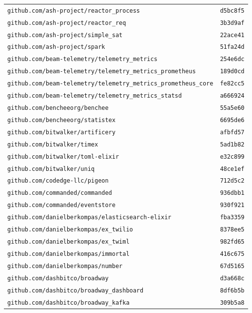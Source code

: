\begin{longtable}{@{}p{} l@{}}
\texttt{github.com/ash-project/reactor\_process} & \texttt{d5bc8f5} \\
\texttt{github.com/ash-project/reactor\_req} & \texttt{3b3d9af} \\
\texttt{github.com/ash-project/simple\_sat} & \texttt{22ace41} \\
\texttt{github.com/ash-project/spark} & \texttt{51fa24d} \\
\texttt{github.com/beam-telemetry/telemetry\_metrics} & \texttt{254e6dc} \\
\texttt{github.com/beam-telemetry/telemetry\_metrics\_prometheus} & \texttt{189d0cd} \\
\texttt{github.com/beam-telemetry/telemetry\_metrics\_prometheus\_core} & \texttt{fe82cc5} \\
\texttt{github.com/beam-telemetry/telemetry\_metrics\_statsd} & \texttt{a666924} \\
\texttt{github.com/bencheeorg/benchee} & \texttt{55a5e60} \\
\texttt{github.com/bencheeorg/statistex} & \texttt{6695de6} \\
\texttt{github.com/bitwalker/artificery} & \texttt{afbfd57} \\
\texttt{github.com/bitwalker/timex} & \texttt{5ad1b82} \\
\texttt{github.com/bitwalker/toml-elixir} & \texttt{e32c899} \\
\texttt{github.com/bitwalker/uniq} & \texttt{48ce1ef} \\
\texttt{github.com/codedge-llc/pigeon} & \texttt{712d5c2} \\
\texttt{github.com/commanded/commanded} & \texttt{936dbb1} \\
\texttt{github.com/commanded/eventstore} & \texttt{930f921} \\
\texttt{github.com/danielberkompas/elasticsearch-elixir} & \texttt{fba3359} \\
\texttt{github.com/danielberkompas/ex\_twilio} & \texttt{8378ee5} \\
\texttt{github.com/danielberkompas/ex\_twiml} & \texttt{982fd65} \\
\texttt{github.com/danielberkompas/immortal} & \texttt{416c675} \\
\texttt{github.com/danielberkompas/number} & \texttt{67d5165} \\
\texttt{github.com/dashbitco/broadway} & \texttt{d3a668c} \\
\texttt{github.com/dashbitco/broadway\_dashboard} & \texttt{8df6b5b} \\
\texttt{github.com/dashbitco/broadway\_kafka} & \texttt{309b5a8} \\

\end{longtable}
